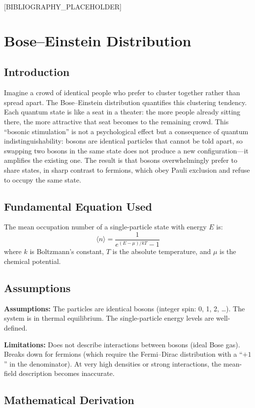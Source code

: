 \documentclass[11pt,openright]{book}
\begin{document}
[BIBLIOGRAPHY_PLACEHOLDER]


\chapter{Bose--Einstein Distribution}

\section*{Introduction}

Imagine a crowd of identical people who prefer to cluster together rather than spread apart. The Bose--Einstein distribution quantifies this clustering tendency. Each quantum state is like a seat in a theater: the more people already sitting there, the more attractive that seat becomes to the remaining crowd. This ``bosonic stimulation'' is not a psychological effect but a consequence of quantum indistinguishability: bosons are identical particles that cannot be told apart, so swapping two bosons in the same state does not produce a new configuration---it amplifies the existing one. The result is that bosons overwhelmingly prefer to share states, in sharp contrast to fermions, which obey Pauli exclusion and refuse to occupy the same state.
\section*{Fundamental Equation Used}

The mean occupation number of a single-particle state with energy $E$ is:
\[
\langle n \rangle = \frac{1}{e^{(E - \mu)/kT} - 1}
\]
where $k$ is Boltzmann's constant, $T$ is the absolute temperature, and $\mu$ is the chemical potential.
\section*{Assumptions}

\textbf{Assumptions:} The particles are identical bosons (integer spin: 0, 1, 2, \ldots). The system is in thermal equilibrium. The single-particle energy levels are well-defined.


\textbf{Limitations:} Does not describe interactions between bosons (ideal Bose gas). Breaks down for fermions (which require the Fermi--Dirac distribution with a ``$+1$'' in the denominator). At very high densities or strong interactions, the mean-field description becomes inaccurate.


\section*{Mathematical Derivation}
\end{document}
